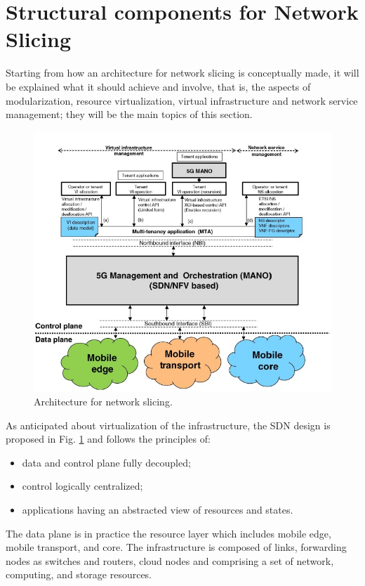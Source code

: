 \documentclass[a4paper,12pt]{report} %
\begin{document}
\section{Structural components for Network Slicing} 
Starting from how an architecture for network slicing is conceptually made, it will be explained what it should achieve and involve, that is, the aspects of modularization, resource virtualization, virtual infrastructure and network service management; they will be the main topics of this section.
\begin{figure}[h]
\centering
\includegraphics[scale=0.67]{pics/2.JPG}
\caption{Architecture for network slicing. \cite{al20185g}} 
\label{Arch}
\end{figure}
As anticipated about virtualization of the infrastructure, the SDN design is proposed in Fig. \ref{Arch} and follows the principles of:
\begin{itemize}
\item data and control plane fully decoupled;
\end{itemize}
\begin{itemize}
\item control logically centralized;
\end{itemize}
\begin{itemize}
\item applications having an abstracted view of resources and states.
\end{itemize}
The data plane is in practice the resource layer which includes mobile edge, mobile transport, and core. The infrastructure is composed of links, forwarding nodes as switches and routers, cloud nodes  and comprising a set of network, computing, and storage resources.\\
\end{document}
